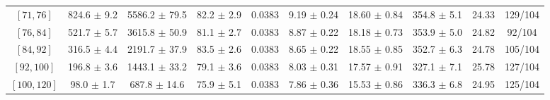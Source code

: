 \begin{tabular}{c||c|c|c|c|c|c|c||c|c}
$[71, 76]$ & 824.6 $\pm$ 9.2 & 5586.2 $\pm$ 79.5 & 82.2 $\pm$ 2.9 & 0.0383 & 9.19 $\pm$ 0.24 & 18.60 $\pm$ 0.84 & 354.8 $\pm$ 5.1 & 24.33 & 129/104\\
$[76, 84]$ & 521.7 $\pm$ 5.7 & 3615.8 $\pm$ 50.9 & 81.1 $\pm$ 2.7 & 0.0383 & 8.87 $\pm$ 0.22 & 18.18 $\pm$ 0.73 & 353.9 $\pm$ 5.0 & 24.82 & 92/104\\
$[84, 92]$ & 316.5 $\pm$ 4.4 & 2191.7 $\pm$ 37.9 & 83.5 $\pm$ 2.6 & 0.0383 & 8.65 $\pm$ 0.22 & 18.55 $\pm$ 0.85 & 352.7 $\pm$ 6.3 & 24.78 & 105/104\\
$[92, 100]$ & 196.8 $\pm$ 3.6 & 1443.1 $\pm$ 33.2 & 79.1 $\pm$ 3.6 & 0.0383 & 8.03 $\pm$ 0.31 & 17.57 $\pm$ 0.91 & 327.1 $\pm$ 7.1 & 25.78 & 127/104\\
$[100, 120]$ & 98.0 $\pm$ 1.7 & 687.8 $\pm$ 14.6 & 75.9 $\pm$ 5.1 & 0.0383 & 7.86 $\pm$ 0.36 & 15.53 $\pm$ 0.86 & 336.3 $\pm$ 6.8 & 24.95 & 125/104\\
\end{tabular}

